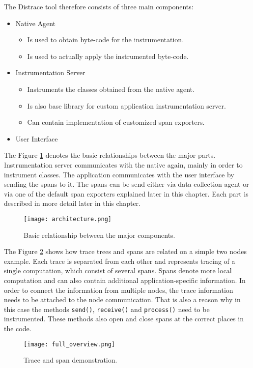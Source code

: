 The Distrace tool therefore consists of three main components:
\begin{itemize}
	\item Native Agent
	\begin{itemize}
		\item Is used to obtain byte-code for the instrumentation.
		\item Is used to actually apply the instrumented byte-code.
	\end{itemize}
	\item Instrumentation Server
	\begin{itemize}
		\item Instruments the classes obtained from the native agent.
		\item Is also base library for custom application instrumentation server.
		\item Can contain implementation of customized span exporters.
	\end{itemize}
	\item User Interface
\end{itemize}


The Figure \ref{fig:architecture} denotes the basic relationships between the major parts. Instrumentation server communicates with the native again, mainly in order to instrument classes. The application communicates with the user interface by sending the spans to it. The spans can be send either via data collection agent or via one of the default span exporters explained later in this chapter. Each part is described in more detail later in this chapter. \begin{figure}
	\centering
	\texttt{[image: architecture.png]}
	\caption{Basic relationship between the major components. }
	\label{fig:architecture}
\end{figure}

The Figure \ref{fig:full_overview} shows how trace trees and spans are related on a simple two nodes example. Each trace is separated from each other and represents tracing of a single computation, which consist of several spans. Spans denote more local computation and can also contain additional application-specific information. In order to connect the information from multiple nodes, the trace information needs to be attached to the node communication. That is also a reason why in this case the methods \texttt{send()}, \texttt{receive()} and \texttt{process()} need to be instrumented. These methods also open and close spans at the correct places in the code.
\begin{figure}
	\centering
	\texttt{[image: full\_overview.png]}
	\caption{Trace and span demonstration. }
	\label{fig:full_overview}
\end{figure}
